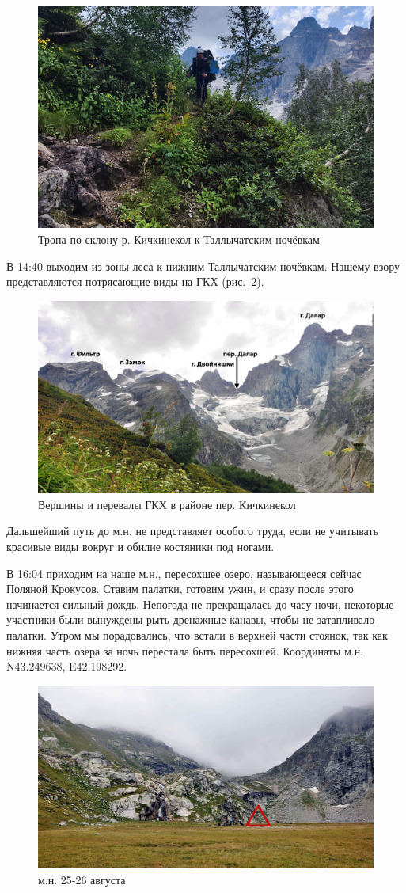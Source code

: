 \begin{figure}[h!]
	\centering
	\includegraphics[width=0.7\linewidth]{../pics/IMG_20240825_134744.jpg}
	\caption{Тропа по склону р. Кичкинекол к Таллычатским ночёвкам}
	\label{fig:IMG_20240825_134744.jpg}
\end{figure}


В 14:40 выходим из зоны леса к нижним Таллычатским ночёвкам. Нашему взору представляются потрясающие виды на ГКХ (рис.~\ref{fig:DSC_0158.JPG}). 

\begin{figure}[h!]
	\centering
	\includegraphics[width=0.7\linewidth]{../pics/DSC_0158.jpg}
	\caption{Вершины и перевалы ГКХ в районе пер. Кичкинекол}
	\label{fig:DSC_0158.JPG}
\end{figure}

Дальшейший путь до м.н. не представляет особого труда, если не учитывать красивые виды вокруг и обилие костяники под ногами.

В 16:04 приходим на наше м.н., пересохшее озеро, называющееся сейчас Поляной Крокусов. Ставим палатки, готовим ужин, и сразу после этого начинается сильный дождь. Непогода не прекращалась до часу ночи, некоторые участники были вынуждены рыть дренажные канавы, чтобы не затапливало палатки. Утром мы порадовались, что встали в верхней части стоянок, так как нижняя часть озера за ночь перестала быть пересохшей.
Координаты м.н. N43.249638\degree, E42.198292\degree.

\begin{figure}[h!]
	\centering
	\includegraphics[width=0.7\linewidth]{../pics/DSC_0177.jpg}
	\caption{м.н. 25-26 августа}
	\label{fig:DSC_0177.JPG}
\end{figure}




\clearpage